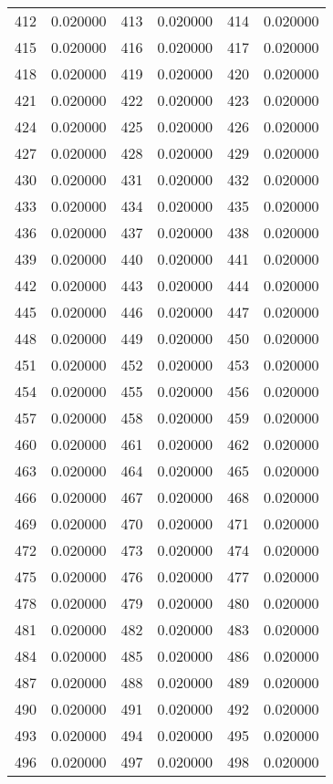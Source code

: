 \documentclass[12pt]{article}
\begin{document}
\begin{longtable}{@{}cc|cc|cc@{}}
412 & 0.020000 & 413 & 0.020000 & 414 & 0.020000 \\
415 & 0.020000 & 416 & 0.020000 & 417 & 0.020000 \\
418 & 0.020000 & 419 & 0.020000 & 420 & 0.020000 \\
421 & 0.020000 & 422 & 0.020000 & 423 & 0.020000 \\
424 & 0.020000 & 425 & 0.020000 & 426 & 0.020000 \\
427 & 0.020000 & 428 & 0.020000 & 429 & 0.020000 \\
430 & 0.020000 & 431 & 0.020000 & 432 & 0.020000 \\
433 & 0.020000 & 434 & 0.020000 & 435 & 0.020000 \\
436 & 0.020000 & 437 & 0.020000 & 438 & 0.020000 \\
439 & 0.020000 & 440 & 0.020000 & 441 & 0.020000 \\
442 & 0.020000 & 443 & 0.020000 & 444 & 0.020000 \\
445 & 0.020000 & 446 & 0.020000 & 447 & 0.020000 \\
448 & 0.020000 & 449 & 0.020000 & 450 & 0.020000 \\
451 & 0.020000 & 452 & 0.020000 & 453 & 0.020000 \\
454 & 0.020000 & 455 & 0.020000 & 456 & 0.020000 \\
457 & 0.020000 & 458 & 0.020000 & 459 & 0.020000 \\
460 & 0.020000 & 461 & 0.020000 & 462 & 0.020000 \\
463 & 0.020000 & 464 & 0.020000 & 465 & 0.020000 \\
466 & 0.020000 & 467 & 0.020000 & 468 & 0.020000 \\
469 & 0.020000 & 470 & 0.020000 & 471 & 0.020000 \\
472 & 0.020000 & 473 & 0.020000 & 474 & 0.020000 \\
475 & 0.020000 & 476 & 0.020000 & 477 & 0.020000 \\
478 & 0.020000 & 479 & 0.020000 & 480 & 0.020000 \\
481 & 0.020000 & 482 & 0.020000 & 483 & 0.020000 \\
484 & 0.020000 & 485 & 0.020000 & 486 & 0.020000 \\
487 & 0.020000 & 488 & 0.020000 & 489 & 0.020000 \\
490 & 0.020000 & 491 & 0.020000 & 492 & 0.020000 \\
493 & 0.020000 & 494 & 0.020000 & 495 & 0.020000 \\
496 & 0.020000 & 497 & 0.020000 & 498 & 0.020000 \\

\end{longtable}
\end{document}
